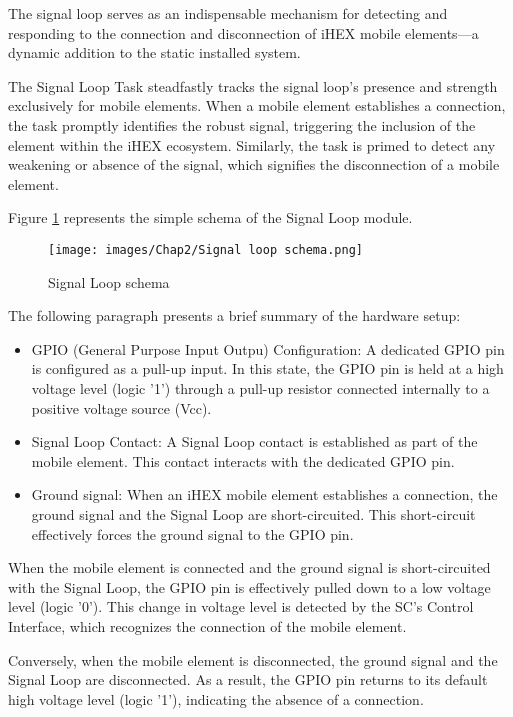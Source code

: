 The signal loop serves as an indispensable mechanism for detecting and responding to the connection and disconnection of iHEX mobile elements—a dynamic addition to the static installed system.

The Signal Loop Task steadfastly tracks the signal loop's presence and strength exclusively for mobile elements. When a mobile element establishes a connection, the task promptly identifies the robust signal, triggering the inclusion of the element within the iHEX ecosystem. Similarly, the task is primed to detect any weakening or absence of the signal, which signifies the disconnection of a mobile element.

Figure \ref{Signal Loop schema} represents the simple schema of the Signal Loop module.

\begin{figure}[H]
\begin{center}
\texttt{[image: images/Chap2/Signal loop schema.png]}\\
\caption{Signal Loop schema}
\label{Signal Loop schema}
\end{center}
\end{figure}

The following paragraph presents a brief summary of the hardware setup:
\begin{itemize}
    \item GPIO (General Purpose Input Outpu) Configuration: A dedicated GPIO pin is configured as a pull-up input. In this state, the GPIO pin is held at a high voltage level (logic '1') through a pull-up resistor connected internally to a positive voltage source (Vcc).
    \item Signal Loop Contact: A Signal Loop contact is established as part of the mobile element. This contact interacts with the dedicated GPIO pin.
    \item Ground signal: When an iHEX mobile element establishes a connection, the ground signal and the Signal Loop are short-circuited. This short-circuit effectively forces the ground signal to the GPIO pin.
\end{itemize}

When the mobile element is connected and the ground signal is short-circuited with the Signal Loop, the GPIO pin is effectively pulled down to a low voltage level (logic '0'). This change in voltage level is detected by the SC's Control Interface, which recognizes the connection of the mobile element.

Conversely, when the mobile element is disconnected, the ground signal and the Signal Loop are disconnected. As a result, the GPIO pin returns to its default high voltage level (logic '1'), indicating the absence of a connection.

